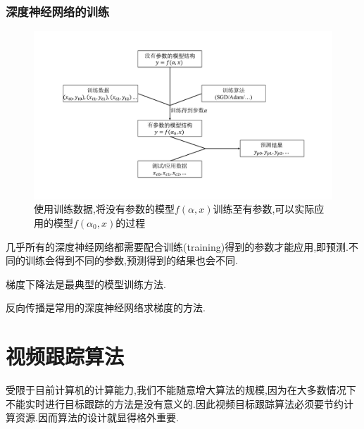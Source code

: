 \subsubsection{深度神经网络的训练}
\par
\begin{figure}[htbp!]
    \centering
    \includegraphics[width = 1.\textwidth]{chap/img/model_learning.pdf}
    \caption{使用训练数据,将没有参数的模型$f(\alpha,x)$训练至有参数,可以实际应用的模型$f(\alpha_0,x)$的过程}
    \label{fig:model_learning}
\end{figure}
几乎所有的深度神经网络都需要配合训练(training)得到的参数才能应用,即预测.不同的训练会得到不同的参数,预测得到的结果也会不同.
\par
梯度下降法是最典型的模型训练方法.
\par
反向传播是常用的深度神经网络求梯度的方法.

\section{视频跟踪算法}
受限于目前计算机的计算能力,我们不能随意增大算法的规模,因为在大多数情况下不能实时进行目标跟踪的方法是没有意义的.因此视频目标跟踪算法必须要节约计算资源.因而算法的设计就显得格外重要.
